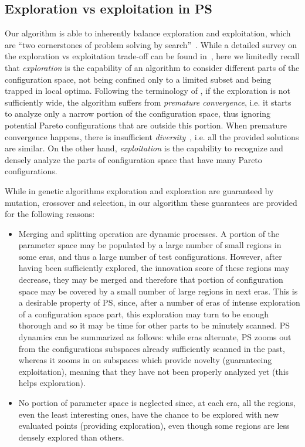 \subsection{Exploration vs exploitation in PS}
Our algorithm is able to inherently balance exploration and exploitation, which are ``two cornerstones of problem solving by search''~\cite{eiben1998evolutionary}. While a detailed survey on the exploration vs exploitation trade-off can be found in~\cite{vcrepinvsek2013exploration}, here we limitedly recall that \emph{exploration} is the capability of an algorithm to consider different parts of the configuration space, not being confined only to a limited subset and being trapped in local optima. Following the terminology of \cite{weise2012evolutionary}, if the exploration is not sufficiently wide, the algorithm suffers from \emph{premature convergence}, i.e. it starts to analyze only a narrow portion of the configuration space, thus ignoring potential Pareto configurations that are outside this portion. When premature convergence happens, there is insufficient \emph{diversity}~\cite{weise2012evolutionary}, i.e. all the provided solutions are similar.
On the other hand, \emph{exploitation} is the capability to recognize and densely analyze the parts of configuration space that have many Pareto configurations.

While in genetic algorithms exploration and exploration are guaranteed by mutation, crossover and selection, in our algorithm these guarantees are provided for the following reasons:
	\begin{itemize}
		\item Merging and splitting operation are dynamic processes. A portion
of the parameter space may be populated by a large number of small
regions in some eras, and thus a large number of test configurations. However, after having been sufficiently explored, the innovation score of these regions may decrease, they may be merged and therefore that portion of configuration space may be covered by a small number of large regions in next eras. This is a desirable property of PS, since, after a number of eras of intense exploration of a configuration space part, this exploration may turn to be enough thorough and so it may be time for other parts to be minutely scanned. 
PS dynamics can be summarized as follows: while eras alternate, PS zooms out from the configurations subspaces already sufficiently scanned in the past, whereas it zooms in on subspaces which provide novelty (guaranteeing exploitation), meaning that they have not been properly analyzed yet (this helps exploration). 
		\item No portion of parameter space is neglected since, at each era, all the regions, even the least interesting ones, have the chance to be explored with new evaluated points (providing exploration), even though some regions are less densely explored than others.
	\end{itemize}

